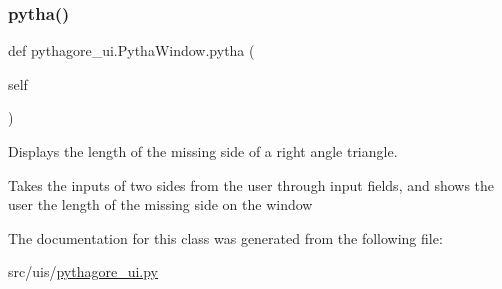 \subsubsection{\texorpdfstring{pytha()}{pytha()}}
{\footnotesize\ttfamily def pythagore\+\_\+ui.\+Pytha\+Window.\+pytha (\begin{DoxyParamCaption}\item[{}]{self }\end{DoxyParamCaption})}



Displays the length of the missing side of a right angle triangle. 

Takes the inputs of two sides from the user through input fields, and shows the user the length of the missing side on the window 

The documentation for this class was generated from the following file\+:\begin{DoxyCompactItemize}
\item 
src/uis/\hyperlink{pythagore__ui_8py}{pythagore\+\_\+ui.\+py}\end{DoxyCompactItemize}
